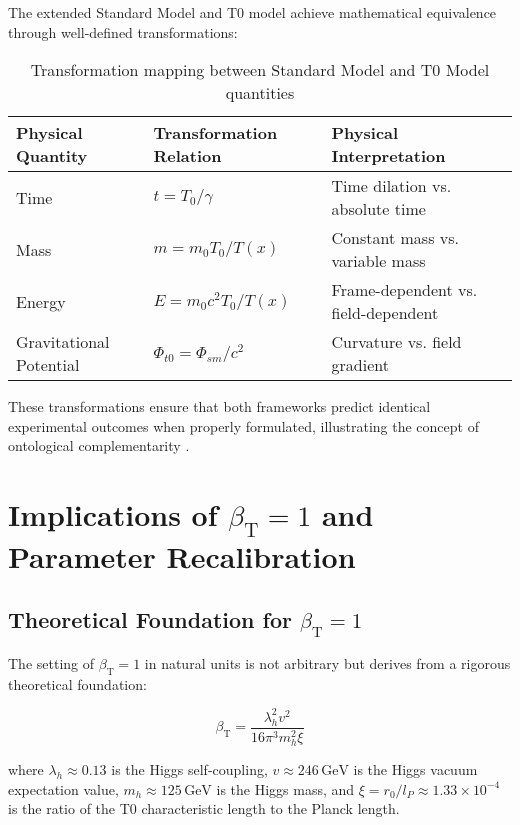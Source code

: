 \documentclass[12pt,a4paper]{article}
\newcommand{\Tfield}{T(x)}
\newcommand{\betaT}{\beta_{\text{T}}}
\newcommand{\Tzero}{T_0}
\begin{document}
	The extended Standard Model and T0 model achieve mathematical equivalence through well-defined transformations:
	
	\begin{table}[H]
		\centering
		\caption{Transformation mapping between Standard Model and T0 Model quantities}
		\label{tab:transformation}
		\begin{tabular}{p{} p{} p{}}
			\hline
			\textbf{Physical Quantity} & \textbf{Transformation Relation} & \textbf{Physical Interpretation} \\
			\hline
			Time & \(t = \Tzero/\gamma\) & Time dilation vs. absolute time \\
			Mass & \(m = m_0 \Tzero/\Tfield\) & Constant mass vs. variable mass \\
			Energy & \(E = m_0 c^2 \Tzero/\Tfield\) & Frame-dependent vs. field-dependent \\
			Gravitational Potential & \(\Phi_{t0} = \Phi_{sm}/c^2\) & Curvature vs. field gradient \\
			\hline
		\end{tabular}
	\end{table}
	
	These transformations ensure that both frameworks predict identical experimental outcomes when properly formulated, illustrating the concept of ontological complementarity \cite{pascher_standardmod_2025}.
	
	\section{Implications of \(\betaT = 1\) and Parameter Recalibration}
	\label{sec:consequences_beta}
	
	\subsection{Theoretical Foundation for \(\betaT = 1\)}
	\label{subsec:beta_foundation}
	
	The setting of \(\betaT = 1\) in natural units is not arbitrary but derives from a rigorous theoretical foundation:
	
	\begin{equation}
		\betaT = \frac{\lambda_h^2 v^2}{16 \pi^3 m_h^2 \xi}
		\label{eq:beta_derivation}
	\end{equation}
	
	where \(\lambda_h \approx 0.13\) is the Higgs self-coupling, \(v \approx 246 \, \text{GeV}\) is the Higgs vacuum expectation value, \(m_h \approx 125 \, \text{GeV}\) is the Higgs mass, and \(\xi = r_0/l_P \approx 1.33 \times 10^{-4}\) is the ratio of the T0 characteristic length to the Planck length.
	
\end{document}
